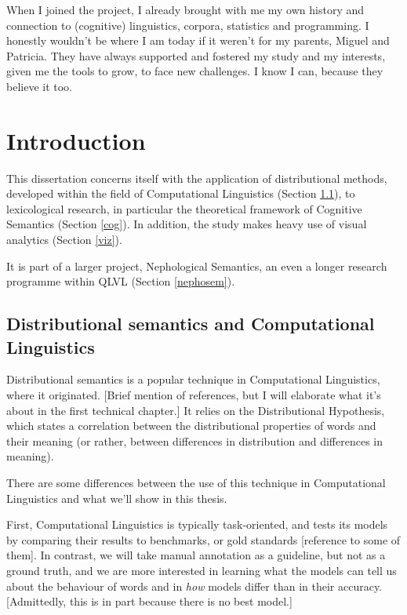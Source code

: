 \documentclass[
]{book}
\begin{document}
When I joined the project, I already brought with me my own history and connection
to (cognitive) linguistics, corpora, statistics and programming. I honestly wouldn't
be where I am today if it weren't for my parents, Miguel and Patricia. They have
always supported and fostered my study and my interests, given me the tools to
grow, to face new challenges. I know I can, because they believe it too.

\hypertarget{introduction}{%
\chapter{Introduction}\label{introduction}}

This dissertation concerns itself with the application of distributional methods,
developed within the field of Computational Linguistics (Section \ref{comp}),
to lexicological research, in particular the theoretical framework of Cognitive Semantics (Section \ref{cog}).
In addition, the study makes heavy use of visual analytics (Section \ref{viz}).

It is part of a larger project, Nephological Semantics, an even a longer research programme within QLVL (Section \ref{nephosem}).

\hypertarget{comp}{%
\section{Distributional semantics and Computational Linguistics}\label{comp}}

Distributional semantics is a popular technique in Computational Linguistics, where it originated.
{[}Brief mention of references, but I will elaborate what it's about in the first technical chapter.{]}
It relies on the Distributional Hypothesis, which states a correlation between the distributional properties
of words and their meaning (or rather, between differences in distribution and differences in meaning).

There are some differences between the use of this technique in Computational Linguistics and what we'll show
in this thesis.

First, Computational Linguistics is typically task-oriented, and tests its models by comparing their
results to benchmarks, or gold standards {[}reference to some of them{]}. In contrast, we will
take manual annotation as a guideline, but not as a ground truth, and we are more interested in
learning what the models can tell us about the behaviour of words and in \emph{how} models differ than
in their accuracy. {[}Admittedly, this is in part because there is no best model.{]}
\end{document}
